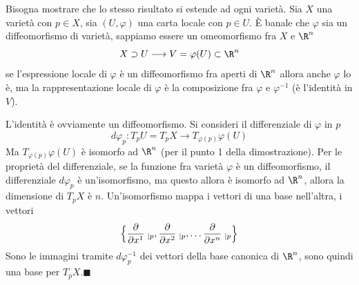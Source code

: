 \documentclass[10pt, letterpaper]{report}
\begin{document}
\noindent{} Bisogna mostrare che lo stesso risultato si estende ad ogni varietà. Sia $X$ una varietà con $p\in X$, sia $(U,\varphi)$ una carta locale con $p\in U$. È banale che $\varphi$ sia un diffeomorfismo di varietà, sappiamo essere un omeomorfismo fra $X$ e $\R^n$\begin{equation}
    X\supset U \longrightarrow V=\varphi(U)\subset\R^n
\end{equation}
se l'espressione locale di $\varphi$ è un diffeomorfismo fra aperti di $\R^n$ allora anche $\varphi$ lo è, ma la rappresentazione locale di $\varphi$ è la composizione fra $\varphi$ e $\varphi^{-1}$ (è l'identità in $V$).
\begin{center}
\end{center}
L'identità è ovviamente un diffeomorfismo. Si consideri il differenziale di $\varphi$ in $p$\begin{equation}
    d\varphi_p:T_pU=T_pX\longrightarrow T_{\varphi(p)}\varphi(U)
\end{equation}
Ma $T_{\varphi(p)}\varphi(U)$ è isomorfo ad $\R^n$ (per il punto 1 della dimostrazione). Per le proprietà del differenziale, se la funzione fra varietà $\varphi$ è un diffeomorfismo, il differenziale $d\varphi_p$ è un'isomorfismo, ma questo allora è isomorfo ad $\R^n$, allora la dimensione di $T_pX$ è $n$. Un'isomorfismo mappa i vettori di una base nell'altra, i vettori \begin{equation}
        \Big\{\frac{\partial}{\partial x^1}\hphantom{.}_{|p},
        \frac{\partial}{\partial x^2}\hphantom{.}_{|p},\dots
        \frac{\partial}{\partial x^n}\hphantom{.}_{|p}\Big\}
    \end{equation} 
Sono le immagini tramite $d\varphi_p^{-1}$ dei vettori della base canonica di $\R^n$, sono quindi una base per $T_pX$.\hfill$\blacksquare$\bigskip
\end{document}
